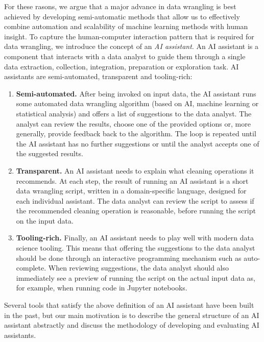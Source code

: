 \documentclass{article}
\begin{document}
For these rasons, we argue that a major advance in data wrangling is best achieved by developing
semi-automatic methods that allow us to effectively combine automation and scalability of machine 
learning methods with human insight. To capture the human-computer interaction pattern that is
required for data wrangling, we introduce the concept of an \emph{AI assistant}. An AI assistant
is a component that interacts with a data analyst to guide them through a single data extraction,
collection, integration, preparation or exploration task. AI assistants are semi-automated, 
transparent and tooling-rich:
%
\begin{enumerate}
\item \textbf{Semi-automated.} After being invoked on input data, the AI assistant runs some automated
  data wrangling algorithm (based on AI, machine learning or statistical analysis) and offers a list
  of suggestions to the data analyst. The analyst can review the results, choose one of the provided
  options or, more generally, provide feedback back to the algorithm. The loop is repeated until 
  the AI assistant has no further suggestions or until the analyst accepts one of the suggested results.

\vspace{-0.2em}
\item \textbf{Transparent.} An AI assistant needs to explain what cleaning operations it recommends. 
  At each step, the result of running an AI assistant is a short data wrangling script, written 
  in a domain-specific language, designed for each individual assistant. The data analyst can 
  review the script to assess if the recommended cleaning operation is reasonable, before running
  the script on the input data.
  
\vspace{-0.2em}
\item \textbf{Tooling-rich.} Finally, an AI assistant needs to play well with modern data science
  tooling. This means that offering the suggestions to the data analyst should be done through an 
  interactive programming mechanism such as auto-complete. When reviewing suggestions, the data 
  analyst should also immediately see a preview of running the script on the actual input data as,
  for example, when running code in Jupyter notebooks.
\end{enumerate}
%
Several tools that satisfy the above definition of an AI assistant have been built in the past, 
but our main motivation is to describe the general structure of an AI assistant abstractly and
discuss the methodology of developing and evaluating AI assistants.
\end{document}
